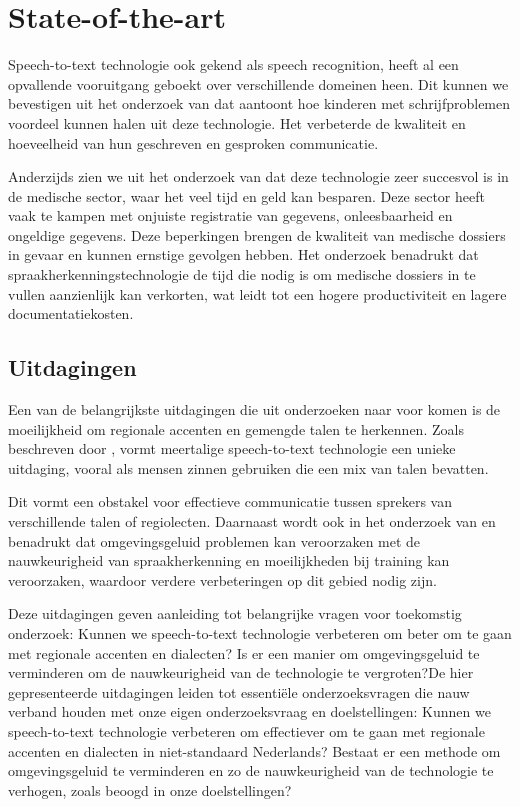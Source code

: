 
\section{State-of-the-art}%
\label{sec:state-of-the-art}
Speech-to-text technologie ook gekend als speech recognition, heeft al een opvallende vooruitgang geboekt over verschillende domeinen heen. Dit kunnen we bevestigen uit het onderzoek van \cite{Kambouri2023} dat aantoont hoe kinderen met schrijfproblemen voordeel kunnen halen uit deze technologie. Het verbeterde de kwaliteit en hoeveelheid van hun geschreven en gesproken communicatie.

Anderzijds zien we uit het onderzoek van \autocite{ajami2016use} dat deze technologie zeer succesvol is in de medische sector, waar het veel tijd en geld kan besparen. Deze sector heeft vaak te kampen met onjuiste registratie van gegevens, onleesbaarheid en ongeldige gegevens. Deze beperkingen brengen de kwaliteit van medische dossiers in gevaar en kunnen ernstige gevolgen hebben. Het onderzoek benadrukt dat spraakherkenningstechnologie de tijd die nodig is om medische dossiers in te vullen aanzienlijk kan verkorten, wat leidt tot een hogere productiviteit en lagere documentatiekosten.

\subsection{Uitdagingen}
Een van de belangrijkste uitdagingen die uit onderzoeken naar voor komen is de moeilijkheid om regionale accenten en gemengde talen te herkennen.
Zoals beschreven door \cite{Reddy2022}, vormt meertalige speech-to-text technologie een unieke uitdaging, vooral als mensen zinnen gebruiken die een mix van talen bevatten.

Dit vormt een obstakel voor effectieve communicatie tussen sprekers van verschillende talen of regiolecten. Daarnaast wordt ook in het onderzoek van \cite{ajami2016use} en \cite{Roepke2019} benadrukt dat omgevingsgeluid problemen kan veroorzaken met de nauwkeurigheid van spraakherkenning en moeilijkheden bij training kan veroorzaken, waardoor verdere verbeteringen op dit gebied nodig zijn.

Deze uitdagingen geven aanleiding tot belangrijke vragen voor toekomstig onderzoek: Kunnen we speech-to-text technologie verbeteren om beter om te gaan met regionale accenten en dialecten? Is er een manier om omgevingsgeluid te verminderen om de nauwkeurigheid van de technologie te vergroten?De hier gepresenteerde uitdagingen leiden tot essentiële onderzoeksvragen die nauw verband houden met onze eigen onderzoeksvraag en doelstellingen: Kunnen we speech-to-text technologie verbeteren om effectiever om te gaan met regionale accenten en dialecten in niet-standaard Nederlands? Bestaat er een methode om omgevingsgeluid te verminderen en zo de nauwkeurigheid van de technologie te verhogen, zoals beoogd in onze doelstellingen?


